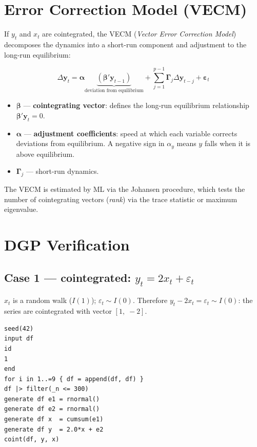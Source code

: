 \section{Error Correction Model (VECM)}

If $y_t$ and $x_t$ are cointegrated, the VECM (\emph{Vector Error Correction
Model}) decomposes the dynamics into a short-run component and adjustment to
the long-run equilibrium:

\[
  \Delta \mathbf{y}_t
  = \boldsymbol{\alpha} \underbrace{(\boldsymbol{\beta}' \mathbf{y}_{t-1})}_{\text{deviation from equilibrium}}
  + \sum_{j=1}^{p-1} \mathbf{\Gamma}_j \Delta \mathbf{y}_{t-j}
  + \boldsymbol{\varepsilon}_t
\]

\begin{itemize}
  \item $\boldsymbol{\beta}$ — \textbf{cointegrating vector}: defines the long-run
        equilibrium relationship $\boldsymbol{\beta}'\mathbf{y}_t = 0$.
  \item $\boldsymbol{\alpha}$ — \textbf{adjustment coefficients}: speed at which
        each variable corrects deviations from equilibrium. A negative sign in
        $\alpha_y$ means $y$ falls when it is above equilibrium.
  \item $\mathbf{\Gamma}_j$ — short-run dynamics.
\end{itemize}

The VECM is estimated by ML via the Johansen procedure, which tests the number
of cointegrating vectors (\emph{rank}) via the trace statistic or maximum eigenvalue.

\section{DGP Verification}

\subsection*{Case 1 — cointegrated: $y_t = 2 x_t + \varepsilon_t$}

$x_t$ is a random walk ($I(1)$); $\varepsilon_t \sim I(0)$. Therefore
$y_t - 2 x_t = \varepsilon_t \sim I(0)$: the series are cointegrated with
vector $[1,\; -2]$.

\begin{lstlisting}[caption={Cointegrated DGP and Engle-Granger test}]
seed(42)
input df
id
1
end
for i in 1..=9 { df = append(df, df) }
df |> filter(_n <= 300)
generate df e1 = rnormal()
generate df e2 = rnormal()
generate df x  = cumsum(e1)
generate df y  = 2.0*x + e2
coint(df, y, x)
\end{lstlisting}

